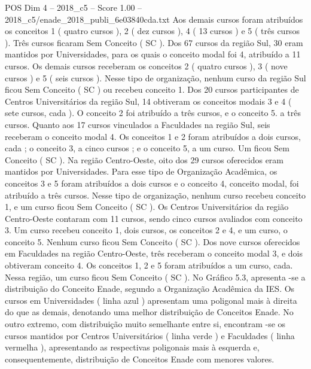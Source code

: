 \begin{textsample}{POS Dim 4 – 2018\_c5 – Score 1.00 – 2018\_c5/enade\_2018\_publi\_6e03840cda.txt}
Aos demais cursos foram atribuídos os conceitos 1 ( quatro cursos ), 2 ( dez cursos ), 4 ( 13 cursos ) e 5 ( três cursos ).
Três cursos ficaram Sem Conceito ( SC ).
Dos 67 cursos da região Sul, 30 eram mantidos por Universidades, para os quais o conceito modal foi 4, atribuído a 11 cursos.
Os demais cursos receberam os conceitos 2 ( quatro cursos ), 3 ( nove cursos ) e 5 ( seis cursos ).
Nesse tipo de organização, nenhum curso da região Sul ficou Sem Conceito ( SC ) ou recebeu conceito 1.
Dos 20 cursos participantes de Centros Universitários da região Sul, 14 obtiveram os conceitos modais 3 e 4 ( sete cursos, cada ).
O conceito 2 foi atribuído a três cursos, e o conceito 5. a três cursos.
Quanto aos 17 cursos vinculados a Faculdades na região Sul, seis receberam o conceito modal 4.
Os conceitos 1 e 2 foram atribuídos a dois cursos, cada ; o conceito 3, a cinco cursos ; e o conceito 5, a um curso.
Um ficou Sem Conceito ( SC ).
Na região Centro-Oeste, oito dos 29 cursos oferecidos eram mantidos por Universidades.
Para esse tipo de Organização Acadêmica, os conceitos 3 e 5 foram atribuídos a dois cursos e o conceito 4, conceito modal, foi atribuído a três cursos.
Nesse tipo de organização, nenhum curso recebeu conceito 1, e um curso ficou Sem Conceito ( SC ).
Os Centros Universitários da região Centro-Oeste contaram com 11 cursos, sendo cinco cursos avaliados com conceito 3.
Um curso recebeu conceito 1, dois cursos, os conceitos 2 e 4, e um curso, o conceito 5.
Nenhum curso ficou Sem Conceito ( SC ).
Dos nove cursos oferecidos em Faculdades na região Centro-Oeste, três receberam o conceito modal 3, e dois obtiveram conceito 4.
Os conceitos 1, 2 e 5 foram atribuídos a um curso, cada.
Nessa região, um curso ficou Sem Conceito ( SC ).
No Gráfico 5.3, apresenta -se a distribuição do Conceito Enade, segundo a Organização Acadêmica da IES.
Os cursos em Universidades ( linha azul ) apresentam uma poligonal mais à direita do que as demais, denotando uma melhor distribuição de Conceitos Enade.
No outro extremo, com distribuição muito semelhante entre si, encontram -se os cursos mantidos por Centros Universitários ( linha verde ) e Faculdades ( linha vermelha ), apresentando as respectivas poligonais mais à esquerda e, consequentemente, distribuição de Conceitos Enade com menores valores.

\end{textsample}
